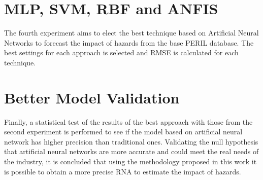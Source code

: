 \section{MLP, SVM, RBF and ANFIS}

The fourth experiment aims to elect the best technique based on Artificial Neural Networks to forecast the impact of hazards from the base PERIL database. The best settings for each approach is selected and RMSE is calculated for each technique.

\section{Better Model Validation}

Finally, a statistical test of the results of the best approach with those from the second experiment is performed to see if the model based on artificial neural network has higher precision than traditional ones. Validating the null hypothesis that artificial neural networks are more accurate and could meet the real needs of the industry, it is concluded that using the methodology proposed in this work it is possible to obtain a more precise RNA to estimate the impact of hazards.

\pagebreak
